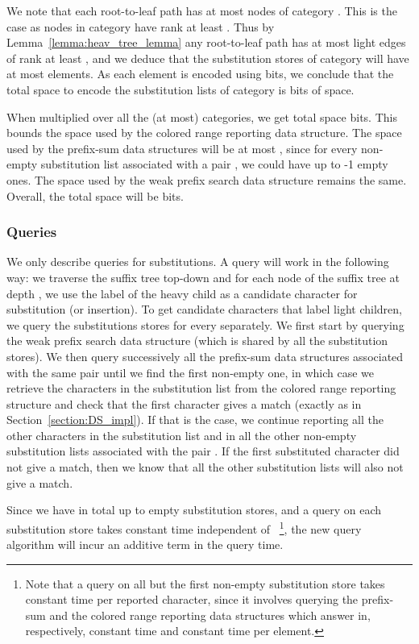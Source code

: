 \documentclass{article}
\newcommand{\?}{\mskip1.5mu}
\begin{document}
We note that each root-to-leaf path has at most  nodes of category . This is the case as nodes in category  have rank at least . Thus by Lemma~\ref{lemma:heav_tree_lemma} any root-to-leaf path has at most  light edges of rank at least , and we deduce that the substitution stores of category  will have at most  elements. As each element is encoded using  bits, we conclude that the total space to encode the substitution lists of category  is  bits of space.

When multiplied over all the (at most)  categories, we get total space  bits.
This bounds the space used by the  colored range reporting data structure. The space used by the prefix-sum data structures will be at most , since for every non-empty substitution list associated with a pair , we could have up to -1 empty ones. 
The space used by the weak prefix search data structure remains the same. 
Overall, the total space will be  bits. 
\subsubsection{Queries}
We only describe queries for substitutions. A query will work in the following way: we traverse the suffix tree top-down and for each node of the suffix tree at depth , we use the label of the heavy child as a candidate character for substitution (or insertion). 
To get candidate characters that label light children, we query the substitutions stores  for every  separately. We first start by querying the weak prefix search data structure (which is shared by all the 
 substitution stores). We then query successively all the  prefix-sum data structures associated with the same pair  until we find the first non-empty one, in which case we retrieve the characters in the substitution list from the  colored range reporting structure and check that the first character gives a match (exactly as in Section~\ref{section:DS_impl}). If that is the case, we continue reporting all the other characters in the substitution list and in all the other non-empty substitution lists associated with the pair . If the first substituted character did not give a match, then we know that all the other substitution lists will also  not give a match. 

Since we have in total up to  empty substitution stores, and a query on each substitution store takes constant time independent of ~\footnote{Note that a query on all but the first non-empty substitution store takes constant time per reported character, since it involves querying the prefix-sum and the  colored range reporting data structures which answer in, respectively, constant time and constant time per element.}, the new query algorithm will incur an additive  term in the query time. 
\end{document}
